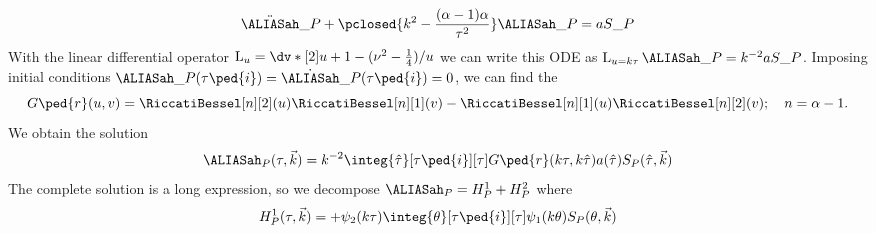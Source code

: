 \begin{draft}
{    \begin{equation}
        \ddot{\ah}\_P + \pclosed{k^2-\frac{(\alpha-1)\alpha}{\tau^2}}\ah\_P = a S\_P
    \end{equation}
    With the linear differential operator $\mathop{\mathrm{L}_{u}}=\dv*[2]{}{u} + 1 - (\nu^2-\frac{1}{4})/u$ we can write this ODE as $\mathop{\mathrm{L}_{u=k\tau}} \ah\_P=  k^{-2}a S\_P$. Imposing initial conditions $\ah\_P(\tau\ped{i})= \dot{\ah}\_P(\tau\ped{i})=0$, we can find the 
    \begin{equation}
        G\ped{r}(u, v)  =\RiccatiBessel[n][2](u) \RiccatiBessel[n][1](v)- \RiccatiBessel[n][1](u) \RiccatiBessel[n][2](v) ; \quad n= \alpha-1.
    \end{equation}
    \citep{kawasakiStudyGravitationalRadiation2011} %
    We obtain the solution
    \begin{equation}
        \ah_P(\tau, \vec{k}) = k^{-2} \integ{\hat{\tau}}[\tau\ped{i}][\tau] G\ped{r}(k\tau, k\hat{\tau}) a (\hat{\tau}) S_P(\hat{\tau}, \vec{k})
    \end{equation}
    The complete solution is a long expression, so we decompose $\ah_P = H^1_P + H^2_P$ where
    \begin{align}
        H_P^1(\tau, \vec{k}) &= +\psi_2(k\tau) \integ{\theta}[\tau\ped{i}][\tau]  \psi_1(k\theta) \Src_P(\theta, \vec{k}) \\

\end{align}}
\end{draft}
